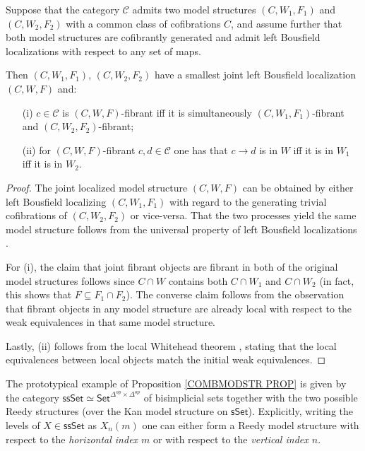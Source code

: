 \documentclass[a4paper,10pt
]{article}%
\begin{document}
\begin{proposition}\label{COMBMODSTR PROP}
	Suppose that the category $\mathcal{C}$
	admits two model structures $(C,W_1,F_1)$ and $(C,W_2,F_2)$
	with a common class of cofibrations $C$,
	and assume further that both model structures are cofibrantly generated and admit left Bousfield localizations with respect to any set of maps.
	
	Then $(C,W_1,F_1)$, $(C,W_2,F_2)$ have a smallest joint left Bousfield localization 
	$(C,W,F)$ and:
\begin{itemize}
	\item[(i)] $c \in \mathcal{C}$ is $(C,W,F)$-fibrant iff it is simultaneously 
	$(C,W_1,F_1)$-fibrant and $(C,W_2,F_2)$-fibrant;
	\item[(ii)] for $(C,W,F)$-fibrant  
	$c,d \in \mathcal{C}$ one has that $c\to d$ is in $W$ iff it is in $W_1$ iff it is in $W_2$.
\end{itemize}
\end{proposition}

\begin{proof}
The joint localized model structure $(C,W,F)$ can be obtained by either left Bousfield localizing $(C,W_1,F_1)$ with regard to the generating trivial cofibrations of $(C,W_2,F_2)$ or vice-versa. That the two processes yield the same model structure follows from the universal property of left Bousfield localizations \cite[Prop. 3.4.18]{Hir03}.
	
For (i), the claim that joint fibrant objects are fibrant in both of the original model structures follows since $C \cap W$ contains both $C \cap W_1$ and $C \cap W_2$ (in fact, this shows that $F \subseteq F_1 \cap F_2$).
The converse claim follows from the observation that fibrant objects in any model structure are already local with respect to the weak equivalences in that same model structure.

Lastly, (ii) follows from the local Whitehead theorem \cite[Thm. 3.3.8]{Hir03}, stating that
the local equivalences between local objects match the
initial weak equivalences.
\end{proof}


The prototypical example of Proposition \ref{COMBMODSTR PROP} is given by the category 
$\mathsf{ssSet} \simeq \mathsf{Set}^{\Delta^{op} \times \Delta^{op}}$
of bisimplicial sets together with the two possible Reedy structures (over the Kan model structure on $\mathsf{sSet}$).
Explicitly, writing the levels of 
$X \in \mathsf{ssSet}$ as $X_n(m)$
one can either form a Reedy model structure with respect to the 
\textit{horizontal index $m$}
or with respect to the 
\textit{vertical index $n$}.
\end{document}
